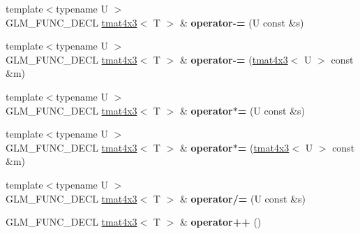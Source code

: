 \begin{DoxyCompactItemize}
\item 
\hypertarget{structglm_1_1detail_1_1tmat4x3_a4855832df75e14908ec7e579e8a36fa7}{{\footnotesize template$<$typename U $>$ }\\G\-L\-M\-\_\-\-F\-U\-N\-C\-\_\-\-D\-E\-C\-L \hyperlink{structglm_1_1detail_1_1tmat4x3}{tmat4x3}$<$ T $>$ \& {\bfseries operator-\/=} (U const \&s)}\label{structglm_1_1detail_1_1tmat4x3_a4855832df75e14908ec7e579e8a36fa7}

\item 
\hypertarget{structglm_1_1detail_1_1tmat4x3_aa1cbe37238954809993e6a308e61d5a1}{{\footnotesize template$<$typename U $>$ }\\G\-L\-M\-\_\-\-F\-U\-N\-C\-\_\-\-D\-E\-C\-L \hyperlink{structglm_1_1detail_1_1tmat4x3}{tmat4x3}$<$ T $>$ \& {\bfseries operator-\/=} (\hyperlink{structglm_1_1detail_1_1tmat4x3}{tmat4x3}$<$ U $>$ const \&m)}\label{structglm_1_1detail_1_1tmat4x3_aa1cbe37238954809993e6a308e61d5a1}

\item 
\hypertarget{structglm_1_1detail_1_1tmat4x3_ad3ab4a6247aeb3a8c2bdcce184eb41a1}{{\footnotesize template$<$typename U $>$ }\\G\-L\-M\-\_\-\-F\-U\-N\-C\-\_\-\-D\-E\-C\-L \hyperlink{structglm_1_1detail_1_1tmat4x3}{tmat4x3}$<$ T $>$ \& {\bfseries operator$\ast$=} (U const \&s)}\label{structglm_1_1detail_1_1tmat4x3_ad3ab4a6247aeb3a8c2bdcce184eb41a1}

\item 
\hypertarget{structglm_1_1detail_1_1tmat4x3_a21b6f431334fa33c0e1b7ed32ff0d1b5}{{\footnotesize template$<$typename U $>$ }\\G\-L\-M\-\_\-\-F\-U\-N\-C\-\_\-\-D\-E\-C\-L \hyperlink{structglm_1_1detail_1_1tmat4x3}{tmat4x3}$<$ T $>$ \& {\bfseries operator$\ast$=} (\hyperlink{structglm_1_1detail_1_1tmat4x3}{tmat4x3}$<$ U $>$ const \&m)}\label{structglm_1_1detail_1_1tmat4x3_a21b6f431334fa33c0e1b7ed32ff0d1b5}

\item 
\hypertarget{structglm_1_1detail_1_1tmat4x3_a0e5434b55efa8b7ec3dcb01d7cb28f1c}{{\footnotesize template$<$typename U $>$ }\\G\-L\-M\-\_\-\-F\-U\-N\-C\-\_\-\-D\-E\-C\-L \hyperlink{structglm_1_1detail_1_1tmat4x3}{tmat4x3}$<$ T $>$ \& {\bfseries operator/=} (U const \&s)}\label{structglm_1_1detail_1_1tmat4x3_a0e5434b55efa8b7ec3dcb01d7cb28f1c}

\item 
\hypertarget{structglm_1_1detail_1_1tmat4x3_a38ac70839201809f248c35b5cc5d8756}{G\-L\-M\-\_\-\-F\-U\-N\-C\-\_\-\-D\-E\-C\-L \hyperlink{structglm_1_1detail_1_1tmat4x3}{tmat4x3}$<$ T $>$ \& {\bfseries operator++} ()}\label{structglm_1_1detail_1_1tmat4x3_a38ac70839201809f248c35b5cc5d8756}


\end{DoxyCompactItemize}

